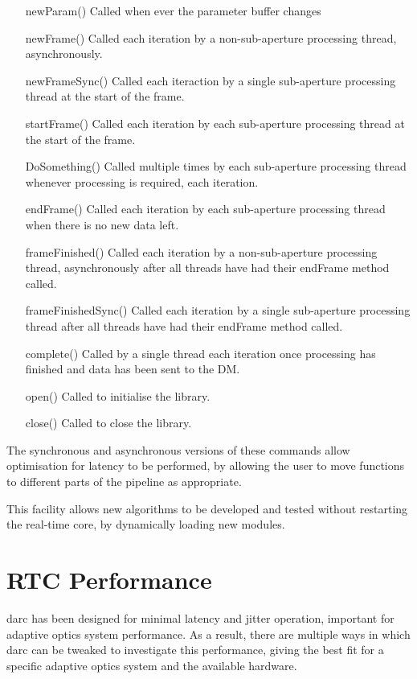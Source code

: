 \documentclass[a4,10pt]{article}
\begin{document}
\begin{itemize}
\item[newParam()] Called when ever the parameter buffer changes
\item[newFrame()] Called each iteration by a non-sub-aperture processing thread,
  asynchronously.
\item[newFrameSync()] Called each iteraction by a single sub-aperture
  processing thread at the start of the frame.
\item[startFrame()] Called each iteration by each sub-aperture
  processing thread at the start of the frame.
\item[DoSomething()] Called multiple times by each sub-aperture
  processing thread whenever processing is required, each iteration.
\item[endFrame()] Called each iteration by each sub-aperture
  processing thread when there is no new data left.
\item[frameFinished()] Called each iteration by a non-sub-aperture
  processing thread, asynchronously after all threads have had their
  endFrame method called.
\item[frameFinishedSync()] Called each iteration by a single sub-aperture
  processing thread after all threads have had their endFrame method
  called.
\item[complete()] Called by a single thread each iteration once
  processing has finished and data has been sent to the DM.
\item[open()] Called to initialise the library.
\item[close()] Called to close the library.
\end{itemize}

The synchronous and asynchronous versions of these commands allow
optimisation for latency to be performed, by allowing the user to move
functions to different parts of the pipeline as appropriate.

This facility allows new algorithms to be developed and tested without
restarting the real-time core, by dynamically loading new modules.


\section{RTC Performance}
darc has been designed for minimal latency and jitter operation, important for
adaptive optics system performance.  As a result, there are multiple
ways in which darc can be tweaked to investigate this performance,
giving the best fit for a specific adaptive optics system and the
available hardware.
\end{document}
